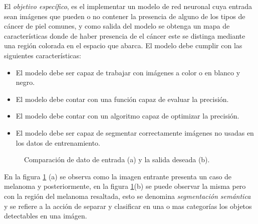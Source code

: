 El \emph{objetivo específico}, es el implementar un modelo de red neuronal cuya entrada sean imágenes que pueden o no contener la presencia de alguno de los tipos de cáncer de piel comunes, y como salida del modelo se obtenga un mapa de características donde de haber presencia de el cáncer este se distinga mediante una región colorada en el espacio que abarca. El modelo debe cumplir con las siguientes características:

\begin{itemize}
    \item El modelo debe ser capaz de trabajar con imágenes a color o en blanco y negro.
    \item El modelo debe contar con una función capaz de evaluar la precisión.
    \item El modelo debe contar con un algoritmo capaz de optimizar la precisión.
    \item El modelo debe ser capaz de segmentar correctamente imágenes no usadas en los datos de entrenamiento.
\end{itemize}

\begin{figure}[!htp]
    \centering
    \qquad
    \caption{Comparación de dato de entrada (a) y la salida deseada (b).}
    \label{data_1}
\end{figure}

En la figura \ref{data_1} (a) se observa como la imagen entrante presenta un caso de melanoma y posteriormente, en la figura \ref{data_1}(b) se puede observar la misma pero con la región del melanoma resaltada, esto se denomina \emph{segmentación semántica} y se refiere a la acción de separar y clasificar en una o mas categorías los objetos detectables en una imágen.


